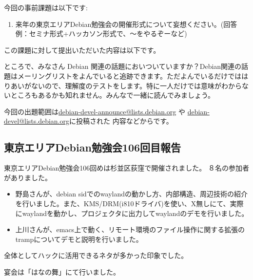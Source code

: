 \documentclass[mingoth,a4paper]{jsarticle}
\begin{document}

今回の事前課題は以下です:
\begin{enumerate}
 \item 来年の東京エリアDebian勉強会の開催形式について妄想ください。(回答例：セミナ形式+ハッカソン形式で、〜をやるぞーなど)
\end{enumerate}
この課題に対して提出いただいた内容は以下です。
\begin{multicols}{2}
{\small
 
}
\end{multicols}


ところで、みなさん Debian 関連の話題においついていますか？Debian関連の話
題はメーリングリストをよんでいると追跡できます。ただよんでいるだけではは
りあいがないので、理解度のテストをします。特に一人だけでは意味がわからな
いところもあるかも知れません。みんなで一緒に読んでみましょう。

今回の出題範囲は\url{debian-devel-announce@lists.debian.org} や \url{debian-devel@lists.debian.org}に投稿された
内容などからです。

\begin{multicols}{2}

\end{multicols}


\subsection{東京エリアDebian勉強会106回目報告}

 東京エリアDebian勉強会106回めは杉並区荻窪で開催されました。
８名の参加者がありました。

\begin{itemize}
\item 野島さんが、debian sidでのwaylandの動かし方、内部構造、周辺技術の紹介を行いました。また、KMS/DRM(i810ドライバ)を使い、X無しにて、実際にwaylandを動かし、プロジェクタに出力してwaylandのデモを行いました。
\item 上川さんが、emacs上で動く、リモート環境のファイル操作に関する拡張のtrampについてデモと説明を行いました。
\end{itemize}

 全体としてハックに活用できるネタが多かった印象でした。
 
 宴会は「はなの舞」にて行いました。
 
\end{document}
